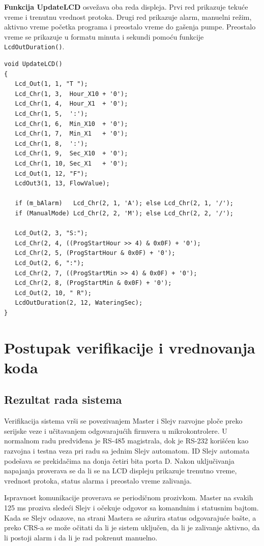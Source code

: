 \documentclass[12pt]{article}
\numberwithin{figure}{section}
\begin{document}
  \textbf{Funkcija UpdateLCD} osvežava oba reda displeja.
  Prvi red prikazuje tekuće vreme i trenutnu vrednost protoka.
  Drugi red prikazuje alarm, manuelni režim, aktivno vreme početka programa i preostalo vreme do gašenja pumpe.
  Preostalo vreme se prikazuje u formatu minuta i sekundi pomoću funkcije \texttt{LcdOutDuration()}.
  \begin{verbatim}
void UpdateLCD()
{
   Lcd_Out(1, 1, "T ");
   Lcd_Chr(1, 3,  Hour_X10 + '0');
   Lcd_Chr(1, 4,  Hour_X1  + '0');
   Lcd_Chr(1, 5,  ':');
   Lcd_Chr(1, 6,  Min_X10  + '0');
   Lcd_Chr(1, 7,  Min_X1   + '0');
   Lcd_Chr(1, 8,  ':');
   Lcd_Chr(1, 9,  Sec_X10  + '0');
   Lcd_Chr(1, 10, Sec_X1   + '0');
   Lcd_Out(1, 12, "F");
   LcdOut3(1, 13, FlowValue);

   if (m_bAlarm)   Lcd_Chr(2, 1, 'A'); else Lcd_Chr(2, 1, '/');
   if (ManualMode) Lcd_Chr(2, 2, 'M'); else Lcd_Chr(2, 2, '/');

   Lcd_Out(2, 3, "S:");
   Lcd_Chr(2, 4, ((ProgStartHour >> 4) & 0x0F) + '0');
   Lcd_Chr(2, 5, (ProgStartHour & 0x0F) + '0');
   Lcd_Out(2, 6, ":");
   Lcd_Chr(2, 7, ((ProgStartMin >> 4) & 0x0F) + '0');
   Lcd_Chr(2, 8, (ProgStartMin & 0x0F) + '0');
   Lcd_Out(2, 10, " R");
   LcdOutDuration(2, 12, WateringSec);
}
  \end{verbatim}

\newpage
\section{Postupak verifikacije i vrednovanja koda }
 \subsection{Rezultat rada sistema}
  Verifikacija sistema vrši se povezivanjem Master i Slejv razvojne ploče preko serijske veze i učitavanjem odgovarajućih firmvera u mikrokontrolere.
  U normalnom radu predviđena je RS-485 magistrala, dok je RS-232 korišćen kao razvojna i testna veza pri radu sa jednim Slejv automatom.
  ID Slejv automata podešava se prekidačima na donja četiri bita porta D. 
  Nakon uključivanja napajanja proverava se da li se na LCD displeju prikazuje trenutno vreme, vrednost protoka, status alarma i preostalo vreme zalivanja.

  Ispravnost komunikacije proverava se periodičnom prozivkom. 
  Master na svakih 125 ms proziva sledeći Slejv i očekuje odgovor sa komandnim i statusnim bajtom. 
  Kada se Slejv odazove, na strani Mastera se ažurira status odgovarajuće bašte, a preko CRS-a se može očitati da li je sistem uključen, da li je zalivanje aktivno, da li postoji alarm i da li je rad pokrenut manuelno.
\end{document}
